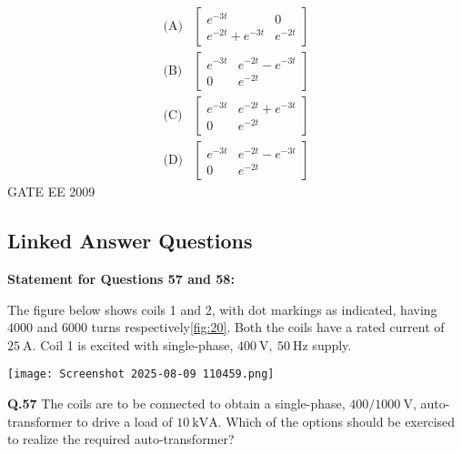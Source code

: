 \documentclass[12pt]{article}
\begin{document}
\[
\begin{array}{ll}
\text{(A)} &
\begin{bmatrix}
e^{-3t} & 0 \\
e^{-2t} + e^{-3t} & e^{-2t}
\end{bmatrix} \\[1em]

\text{(B)} &
\begin{bmatrix}
e^{-3t} & e^{-2t} - e^{-3t} \\
0 & e^{-2t}
\end{bmatrix} \\[1em]

\text{(C)} &
\begin{bmatrix}
e^{-3t} & e^{-2t} + e^{-3t} \\
0 & e^{-2t}
\end{bmatrix} \\[1em]

\text{(D)} &
\begin{bmatrix}
e^{-3t} & e^{-2t} - e^{-3t} \\
0 & e^{-2t}
\end{bmatrix}
\end{array}
\]
\hspace{10pt}
GATE EE 2009\\


\subsection*{Linked Answer Questions}

\textbf{Statement for Questions 57 and 58:}

The figure below shows coils 1 and 2, with dot markings as indicated, having \( 4000 \) and \( 6000 \) turns respectively\ref{fig:20}.  
Both the coils have a rated current of \( 25 \ \mathrm{A} \).  
Coil 1 is excited with single-phase, \( 400 \ \mathrm{V},\ 50 \ \mathrm{Hz} \) supply.

\begin{center}
\texttt{[image: Screenshot 2025-08-09 110459.png]}
\label{fig:20}
\end{center}

\vspace{0.5cm}

\textbf{Q.57}  
The coils are to be connected to obtain a single-phase, \(400/1000 \ \mathrm{V}\), auto-transformer to drive a load of \(10 \ \mathrm{kVA}\).  
Which of the options should be exercised to realize the required auto-transformer?
\end{document}
